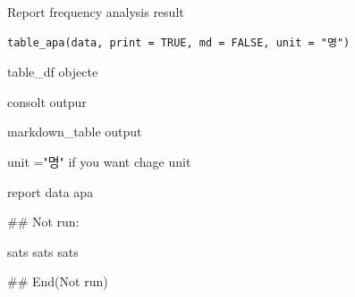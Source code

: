 \documentclass[a4paper]{book}
\begin{document}
%
\begin{Description}
Report frequency analysis result
\end{Description}
%
\begin{Usage}
\begin{verbatim}
table_apa(data, print = TRUE, md = FALSE, unit = "명")
\end{verbatim}
\end{Usage}
%
\begin{Arguments}
\begin{ldescription}
\item[\code{data}] table\_df objecte

\item[\code{print}] consolt outpur

\item[\code{md}] markdown\_table output

\item[\code{unit}] unit ="명" if you want chage unit
\end{ldescription}
\end{Arguments}
%
\begin{Value}
report data apa
\end{Value}
%
\begin{Examples}
\begin{ExampleCode}

\#\# Not run: 

sats %
sats %
sats %

## End(Not run)

\end{ExampleCode}
\end{Examples}
\end{document}
